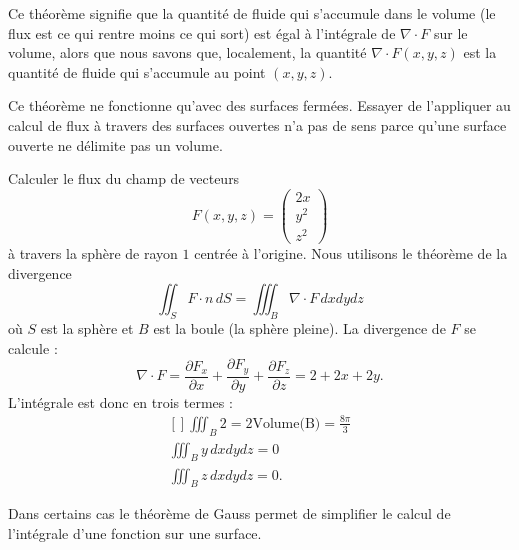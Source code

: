 Ce théorème signifie que la quantité de fluide qui s'accumule dans le volume (le flux est ce qui rentre moins ce qui sort) est égal à l'intégrale de $\nabla\cdot F$ sur le volume, alors que nous savons que, localement, la quantité $\nabla\cdot F(x,y,z)$ est la quantité de fluide qui s'accumule au point $(x,y,z)$.

\begin{remark}
    Ce théorème ne fonctionne qu'avec des surfaces fermées. Essayer de l'appliquer au calcul de flux à travers des surfaces ouvertes n'a pas de sens parce qu'une surface ouverte ne délimite pas un volume.
\end{remark}

\begin{example}
    Calculer le flux du champ de vecteurs
    \begin{equation}
        F(x,y,z)=\begin{pmatrix}
            2x    \\ 
            y^2    \\ 
            z^2    
        \end{pmatrix}
    \end{equation}
    à travers la sphère de rayon $1$ centrée à l'origine. Nous utilisons le théorème de la divergence
    \begin{equation}
        \iint_S F\cdot n\,dS=\iiint_B\nabla \cdot F\,dxdydz
    \end{equation}
    où $S$ est la sphère et $B$ est la boule (la sphère pleine). La divergence de $F$ se calcule :
    \begin{equation}
        \nabla\cdot F=\frac{ \partial F_x }{ \partial x }+\frac{ \partial F_y }{ \partial y }+\frac{ \partial F_z }{ \partial z }=2+2x+2y.
    \end{equation}
    L'intégrale est donc en trois termes :
    \begin{equation}
        \begin{aligned}[]
            \iiint_B2=2\text{Volume(B)}=\frac{ 8\pi }{ 3 }\\
            \iiint_By\,dxdydz=0\\
            \iiint_Bz\,dxdydz=0.
        \end{aligned}
    \end{equation}
\end{example}

Dans certains cas le théorème de Gauss permet de simplifier le calcul de l'intégrale d'une fonction sur une surface.

